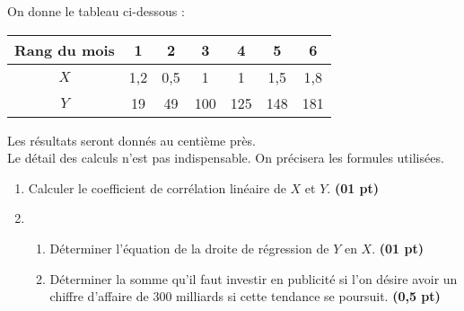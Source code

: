 \documentclass[12pt,a4paper]{article}
\begin{document}
On donne le tableau ci-dessous :

\vspace{0.3cm}

\begin{center}
\begin{tabular}{|c|c|c|c|c|c|c|}
\hline
Rang du mois & 1 & 2 & 3 & 4 & 5 & 6 \\
\hline
\( X \) & 1{,}2 & 0{,}5 & 1 & 1 & 1{,}5 & 1{,}8 \\
\hline
\( Y \) & 19 & 49 & 100 & 125 & 148 & 181 \\
\hline
\end{tabular}
\end{center}

\vspace{0.4cm}

Les résultats seront donnés au centième près.\\
Le détail des calculs n’est pas indispensable. On précisera les formules utilisées.

\vspace{0.3cm}

\begin{enumerate}
    \item Calculer le coefficient de corrélation linéaire de \( X \) et \( Y \). \hfill \textbf{(01 pt)}

    \item 
    \begin{enumerate}
        \item Déterminer l’équation de la droite de régression de \( Y \) en \( X \). \hfill \textbf{(01 pt)}

        \item Déterminer la somme qu’il faut investir en publicité si l’on désire avoir un chiffre d’affaire de 300 milliards si cette tendance se poursuit. \hfill \textbf{(0,5 pt)}
    \end{enumerate}
\end{enumerate}
\end{document}
